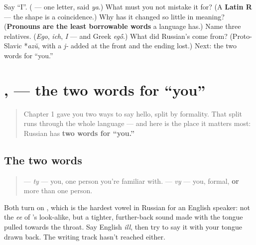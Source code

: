 \begin{tcolorbox}[breakable,colback=teal!4,colframe=teal!35!black,title={Before you move on}]
Say \textquotedblleft{}I\textquotedblright{}. (\textbf{} — one letter, said \emph{ya}.) What must you not mistake it for? (A \textbf{Latin R} — the shape is a coincidence.) Why has it changed so little in meaning? (\textbf{Pronouns are the least borrowable words} a language has.) Name three relatives. (\emph{Ego}, \emph{ich}, \emph{I} — and Greek \emph{eg\'{\={o}}}.) What did Russian's come from? (Proto-Slavic *\emph{azŭ}, with a \emph{j-} added at the front and the ending lost.) Next: the two words for \textquotedblleft{}you.\textquotedblright{}
\end{tcolorbox}
\section[\texorpdfstring{\ru{ты}, \ru{вы} (ty, vy)}{ты, вы (ty, vy)}]{,  — the two words for \textquotedblleft{}you\textquotedblright{}}

\label{lesson:RU-C02-ty-vy}



\begin{quote}
Chapter 1 gave you two ways to say hello, split by formality. That split runs through the whole language — and here is the place it matters most: Russian has \textbf{two words for \textquotedblleft{}you.\textquotedblright{}}
\end{quote}

\subsection*{The two words}
\begin{quote}
\textbf{} — \emph{ty} — you, one person you're familiar with. \textbf{} — \emph{vy} — you, formal, \textbf{or} more than one person.
\end{quote}

Both turn on \textbf{}, which is the hardest vowel in Russian for an English speaker: not the \emph{ee} of \emph{}'s look-alike, but a tighter, further-back sound made with the tongue pulled towards the throat. Say English \emph{ill}, then try to say it with your tongue drawn back. The writing track hasn't reached \textbf{} either.

